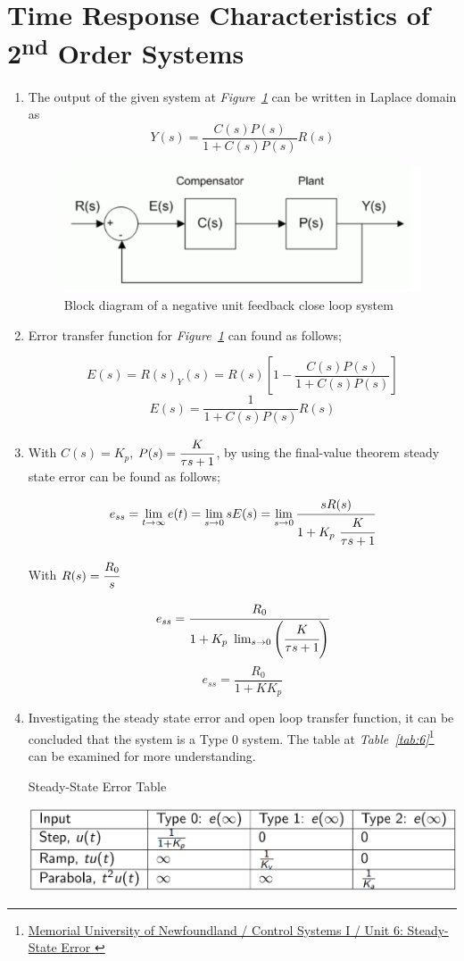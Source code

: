 \documentclass[a4paper,12pt]{article}
\newcommand\nd{\textsuperscript{nd}\xspace}
\begin{document}
\section{\large Time Response Characteristics of 2\nd Order Systems}
	\begin{enumerate}[resume]
		\item The output of the given system at \textit{Figure~\ref{fig:3}} can be written in Laplace domain as
			$$  Y(s) =\frac{C(s)P(s)}{1+C(s)P(s)}R(s)  $$
			\begin{figure}[H]
				\center
				\setlength{\unitlength}{\textwidth} 
				\includegraphics[width=0.7\unitlength]{images/3}
				\caption{\label{fig:3} Block diagram of a negative unit feedback close loop system }
			\end{figure}
		
		\item Error transfer function for \textit{Figure~\ref{fig:3}} can found as follows;
		
			$$ E(s)=R(s)_Y(s)=R(s)\left[ 1 -\frac{C(s)P(s)}{1+C(s)P(s)}\right]$$
			$$ \boxed{ E(s) =\frac{1}{1+C(s)P(s)}R(s) }$$
			
		\item With $C(s)=K_p$, $P(s)=\cfrac{K}{\tau s +1}$, by using the final-value theorem steady state error can be found as follows;
			
			$$ e_{ss} = \lim_{t \to \infty}e(t)=\lim_{s \to 0} sE(s)=\lim_{s \to 0} \cfrac{sR(s)}{1+K_p\ \cfrac{K}{\tau s +1}}$$
			
			With $R(s)=\cfrac{R_0}{s}$
			
			$$ e_{ss} = \cfrac{R_0}{1+K_p\ \lim_{s \to 0}\left( \cfrac{K}{\tau s +1} \right) }$$
			$$\boxed{ e_{ss} =\frac{R_0}{1+K K_p} }$$
			
			
		\item Investigating the steady state error and open loop transfer function, it can be concluded that the system is a Type 0 system. The table at \textit{Table~\ref{tab:6}}\footnote{ \href{http://www.cs.mun.ca/av/old/teaching/cs/notes/steady_printout.pdf}{Memorial University of Newfoundland / Control Systems I / Unit 6: Steady-State Error } } can be examined for more understanding. 
			\begin{table}[H]
				\center
				\setlength{\unitlength}{\textwidth} 
				\caption{\label{tab:6} Steady-State Error Table } 
				\includegraphics[width=1.0\unitlength]{images/6}
			\end{table}		
		

\end{enumerate}
\end{document}
